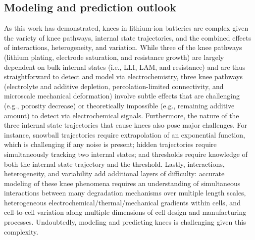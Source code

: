 \documentclass[journal=jpclcd,manuscript=article]{achemso}
\newcommand{\gbox}[1]{{
\fbox{
\parbox{0.8\textwidth}{  \fbox{$\triangleright$\textcolor{blue}{\textbf{Gon}:}} 
#1
}}}}
\newcommand{\pbox}[1]{{
\fbox{
\parbox{0.8\textwidth}{  \fbox{$\triangleright$\textcolor{blue}{\textbf{Peter}:}} 
#1
}}}}
\begin{document}





\subsection{Modeling and prediction outlook}


As this work has demonstrated, knees in lithium-ion batteries are complex given the variety of knee pathways, internal state trajectories, and the combined effects of interactions, heterogeneity, and variation. While three of the knee pathways (lithium plating, electrode saturation, and resistance growth) are largely dependent on bulk internal states (i.e., LLI, LAM, and resistance) and are thus straightforward to detect and model via electrochemistry, three knee pathways (electrolyte and additive depletion, percolation-limited connectivity, and microscale mechanical deformation) involve subtle effects that are challenging (e.g., porosity decrease) or theoretically impossible (e.g., remaining additive amount) to detect via electrochemical signals. Furthermore, the nature of the three internal state trajectories that cause knees also pose major challenges. For instance, snowball trajectories require extrapolation of an exponential function, which is challenging if any noise is present; hidden trajectories require simultaneously tracking two internal states; and thresholds require knowledge of both the internal state trajectory and the threshold. Lastly, interactions, heterogeneity, and variability add additional layers of difficulty: accurate modeling of these knee phenomena requires an understanding of simultaneous interactions between many degradation mechanisms over multiple length scales, heterogeneous electrochemical/thermal/mechanical gradients within cells, and cell-to-cell variation along multiple dimensions of cell design and manufacturing processes. Undoubtedly, modeling and predicting knees is challenging given this complexity.
\end{document}
